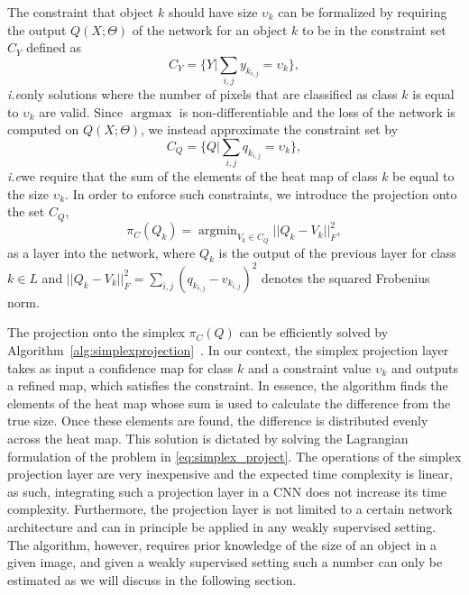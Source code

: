 \documentclass{bmvc2k}
\def\ie{\emph{i.e}\bmvaOneDot}
\DeclareMathOperator*{\argmin}{\mathrm{argmin}}
\DeclareMathOperator*{\argmax}{\mathrm{argmax}}
\begin{document}
The constraint that object $k$ should have size $\upsilon_k$ can be formalized by requiring the output $Q(X;\Theta)$ of the network for an object $k$ to be in the constraint set $C_Y$ defined as 
	\begin{equation}
	C_Y=\{Y | \sum_{i,j}y_{k_{i,j}}=\upsilon_k\},
	\end{equation}
	\ie only solutions where the number of pixels that are classified as class $k$ is equal to $\upsilon_k$ are valid. Since $\argmax$ is non-differentiable and the loss of the network is computed on $Q(X;\Theta)$, we instead approximate the constraint set by     
\begin{equation}
	C_Q=\{Q | \sum_{i,j}q_{k_{i,j}}=\upsilon_k\},
\end{equation}
\ie we require that the sum of the elements of the heat map of class $k$ be equal to the size $\upsilon_k$. 
	In order to enforce such constraints, we introduce the projection onto the set $C_Q$,
		\begin{equation}\label{eq:project}
		\pi_C(Q_k)=\argmin_{V_k\in C_Q}||Q_k-V_k||_F^2,
		\end{equation}
	as a layer into the network, where $Q_k$ is the output of the previous layer for class $k\in L$ and $||Q_k-V_k||_F^2=\sum_{i,j}(q_{k_{i,j}}-v_{k_{i,j}})^2$ denotes the squared Frobenius norm.   
	
	The projection onto the simplex $\pi_C(Q)$ can be efficiently solved by Algorithm~\ref{alg:simplexprojection}~\citep{duchi2008efficient}. In our context, the simplex projection layer takes as input a confidence map for class $k$ and a constraint value $\upsilon_k$ and outputs a refined map, which satisfies the constraint. In essence, the algorithm finds the elements of the heat map whose sum is used to calculate the difference from the true size. Once these elements are found, the difference is distributed evenly across the heat map. This solution is dictated by solving the Lagrangian formulation of the problem in  \eqref{eq:simplex_project}.
	The operations of the simplex projection layer are very inexpensive and the expected time complexity is linear, as such, integrating such a projection layer in a CNN does not increase its time complexity. Furthermore, the projection layer is not limited to a certain network architecture and can in principle be applied in any weakly supervised setting. The algorithm, however, requires prior knowledge of the size of an object in a given image, and given a weakly supervised setting such a number can only be estimated as we will discuss in the following section.   
	
\end{document}
